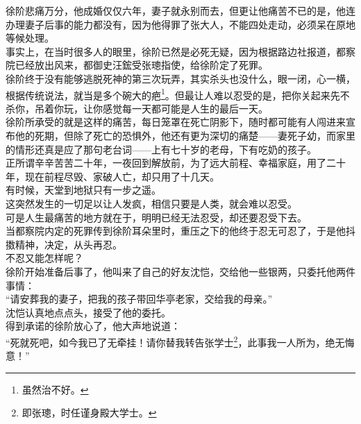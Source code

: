 \begin{multicols}{\theparacolNo}
徐阶悲痛万分，他成婚仅仅六年，妻子就永别而去，但更让他痛苦不已的是，他连办理妻子后事的能力都没有，因为他得罪了张大人，不能四处走动，必须呆在原地等候处理。\\

事实上，在当时很多人的眼里，徐阶已然是必死无疑，因为根据路边社报道，都察院已经放出风来，都御史汪鋐受张璁指使，给徐阶定了死罪。\\

徐阶终于没有能够逃脱死神的第三次玩弄，其实杀头也没什么，眼一闭，心一横，根据传统说法，就当是多个碗大的疤\footnote{虽然治不好。}。但最让人难以忍受的是，把你关起来先不杀你，吊着你玩，让你感觉每一天都可能是人生的最后一天。\\

徐阶所承受的就是这样的痛苦，每日笼罩在死亡阴影下，随时都可能有人闯进来宣布他的死期，但除了死亡的恐惧外，他还有更为深切的痛楚——妻死子幼，而家里的情形还真是应了那句老台词——上有七十岁的老母，下有吃奶的孩子。\\

正所谓辛辛苦苦二十年，一夜回到解放前，为了远大前程、幸福家庭，用了二十年，现在前程尽毁、家破人亡，却只用了十几天。\\

有时候，天堂到地狱只有一步之遥。\\

这突然发生的一切足以让人发疯，相信只要是人类，就会难以忍受。\\

可是人生最痛苦的地方就在于，明明已经无法忍受，却还要忍受下去。\\

当都察院内定的死罪传到徐阶耳朵里时，重压之下的他终于忍无可忍了，于是他抖擞精神，决定，从头再忍。\\

不忍又能怎样呢？\\

徐阶开始准备后事了，他叫来了自己的好友沈恺，交给他一些银两，只委托他两件事情：\\

“请安葬我的妻子，把我的孩子带回华亭老家，交给我的母亲。”\\

沈恺认真地点点头，接受了他的委托。\\

得到承诺的徐阶放心了，他大声地说道：\\

“死就死吧，如今我已了无牵挂！请你替我转告张学士\footnote{即张璁，时任谨身殿大学士。}，此事我一人所为，绝无悔意！”\\


\end{multicols}
